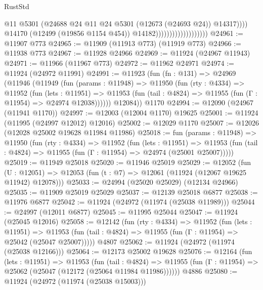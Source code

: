 \begin{lexlean}{RustStd}
\begin{coremodule}
{\begin{coremodule}
{{{{{{{{{{{{{{{{{{{{{{{{{{{{{{{{{{{{{{{{{{{{{{{{{{{{{{{{{{{{{{{{{{{{{{{{{{{{{{{{                                                @11
                                                @5301
                                                (@24688
                                                  @24
                                                  @11
                                                  @24
                                                  @5301
                                                  (@12673 (@24693 @24))
                                                  @14317))))
                                          @14170
                                          (@12499 (@19856 @1154 @454))
                                          @14182)))))))))))))))))))
@24961 := @11907 @773
@24965 := @11909 (@11913 @773) (@11919 @773)
@24966 := @11938 @773
@24967 := @11928 @24966
@24969 := @11924 (@24967 @11943)
@24971 := @11966 (@11967 @773)
@24972 := @11962 @24971
@24974 := @11924 (@24972 @11991)
@24991 := @11923
    (fun (fn : @131) =>
    @24969
      (@11946
        (@11949
          (fun (params : @11948) =>
          @11950
            (fun (rty : @4334) =>
            @11952
              (fun (lets : @11951) =>
              @11953 (fun (tail : @4824) => @11955 (fun (Γ : @11954) => @24974 @12038))))))
        @12084))
    @1170
@24994 := @12090 (@24967 (@11941 @1170))
@24997 := @12003 (@12004 @1170) @19625
@25001 := @11924 (@11995 (@24997 @12012) @12016)
@25002 := @12029 @1170
@25007 := @12026 (@12028 @25002 @19628 @11984 @11986)
@25018 := fun (params : @11948) =>
  @11950
    (fun (rty : @4334) =>
    @11952
      (fun (lets : @11951) =>
      @11953 (fun (tail : @4824) => @11955 (fun (Γ : @11954) => @24974 (@25001 @25007)))))
@25019 := @11949 @25018
@25020 := @11946 @25019
@25029 := @12052
    (fun (U : @12051) => @12053 (fun (t : @7) => @12061 (@11924 (@12067 @19625 @11942) @12078)))
@25033 := @24994 (@25020 @25029) (@12134 @24966)
@25035 := @11909 @25019 @25029
@25037 := @12139 @25018 @6877
@25038 := @11976 @6877
@25042 := @11924 (@24972 (@11974 (@25038 @11989)))
@25044 := @24997 (@12011 @6877)
@25045 := @11995 @25044
@25047 := @11924 (@25045 @12016)
@25058 := @12142
    (fun (rty : @4334) =>
    @11952
      (fun (lets : @11951) =>
      @11953 (fun (tail : @4824) => @11955 (fun (Γ : @11954) => @25042 (@25047 @25007)))))
    @4807
@25062 := @11924 (@24972 (@11974 (@25038 @12166)))
@25064 := @12173 @25002 @19628
@25076 := @12164
    (fun (lets : @11951) =>
    @11953
      (fun (tail : @4824) =>
      @11955 (fun (Γ : @11954) => @25062 (@25047 (@12172 (@25064 @11984 @11986))))))
    @4886
@25080 := @11924 (@24972 (@11974 (@25038 @15003)))
}}}}}}}}}}}}}}}}}}}}}}}}}}}}}}}}}}}}}}}}}}}}}}}}}}}}}}}}}}}}}}}}}}}}}}}}}}}}}}}}
\end{coremodule}}
\end{coremodule}
\end{lexlean}
